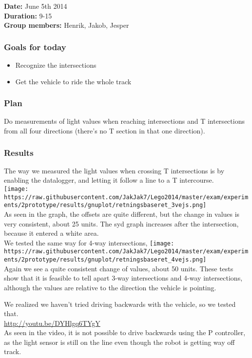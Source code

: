 \textbf{Date:} June 5th 2014\\\textbf{Duration:} 9-15\\\textbf{Group
members:} Henrik, Jakob, Jesper

\subsubsection{Goals for today}

\begin{itemize}
\itemsep1pt\parskip0pt
\item
  Recognize the intersections
\item
  Get the vehicle to ride the whole track
\end{itemize}

\subsubsection{Plan}

Do measurements of light values when reaching intersections and T
intersections from all four directions (there's no T section in that one
direction).

\subsubsection{Results}

The way we measured the light values when crossing T intersections is by
enabling the datalogger, and letting it follow a line to a T
intercourse.\\\texttt{[image: https://raw.githubusercontent.com/JakJak7/Lego2014/master/exam/experiments/2prototype/results/gnuplot/retningsbaseret\_3vejs.png]}\\As
seen in the graph, the offsets are quite different, but the change in
values is very consistent, about 25 units. The syd graph increases after
the intersection, because it entered a white area.\\We tested the same
way for 4-way intersections,
\texttt{[image: https://raw.githubusercontent.com/JakJak7/Lego2014/master/exam/experiments/2prototype/results/gnuplot/retningsbaseret\_4vejs.png]}\\Again
we see a quite consistent change of values, about 50 units. These tests
show that it is feasible to tell apart 3-way intersections and 4-way
intersections, although the values are relative to the direction the
vehicle is pointing.

We realized we haven't tried driving backwards with the vehicle, so we
tested that.\\\url{http://youtu.be/DYHlgq6TYgY}\\As seen in the video,
it is not possible to drive backwards using the P controller, as the
light sensor is still on the line even though the robot is getting way
off track.

